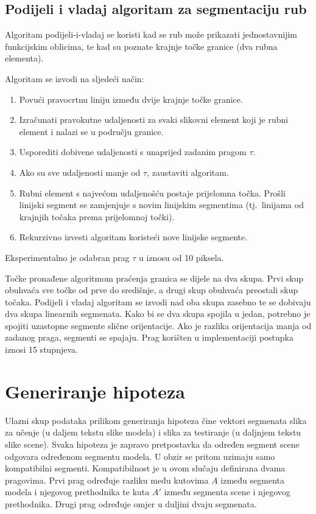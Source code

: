 \documentclass[lmodern, utf8, seminar, numeric]{fer}
\begin{document}
\subsection{Podijeli i vladaj algoritam za segmentaciju rub}
Algoritam podijeli-i-vladaj se koristi kad se rub može prikazati jednostavnijim funkcijskim oblicima, te kad su poznate krajnje točke granice (dva rubna elementa).

Algoritam se izvodi na sljedeći način:
\begin{enumerate}
  \item
Povući pravocrtnu liniju između dvije krajnje točke granice.
   \item Izračunati pravokutne udaljenosti za svaki slikovni element koji je rubni element i nalazi se u području granice.
   \item Usporediti dobivene udaljenosti s unaprijed zadanim pragom $\tau$.
   \item Ako su sve udaljenosti manje od $\tau$, zaustaviti algoritam.
   \item Rubni element s najvećom udaljenošću postaje prijelomna točka. Prošli linijski segment se zamjenjuje s novim linijskim segmentima (tj.\ linijama od krajnjih točaka prema prijelomnoj točki).
   \item Rekurzivno izvesti algoritam koristeći nove linijske segmente.
\end{enumerate}

Eksperimentalno je odabran prag $\tau$ u iznosu od 10 piksela.

Točke pronađene algoritmom praćenja granica se dijele na dva skupa. Prvi skup obuhvaća sve točke od prve do središnje, a drugi skup obuhvaća preostali skup točaka. Podijeli i vladaj algoritam se izvodi nad oba skupa zasebno te se dobivaju dva skupa linearnih segmenata. Kako bi se dva skupa spojila u jedan, potrebno je spojiti uzastopne segmente slične orijentacije. Ako je razlika orijentacija manja od zadanog praga, segmenti se spajaju. Prag korišten u implementaciji postupka iznosi 15 stupnjeva.

\section{Generiranje hipoteza}
Ulazni skup podataka prilikom generiranja hipoteza čine vektori segmenata slika za učenje (u daljem tekstu slike modela) i slika za testiranje (u daljnjem tekstu slike scene). Svaka hipoteza je zapravo pretpostavka da određen segment scene odgovara određenom segmentu modela. U obzir se pritom uzimaju samo kompatibilni segmenti. Kompatibilnost je u ovom slučaju definirana dvama pragovima. Prvi prag određuje razliku među kutovima $A$ između segmenta modela i njegovog prethodnika te kuta $A'$ između segmenta scene i njegovog prethodnika. Drugi prag određuje omjer u duljini dvaju segmenata.
\end{document}

